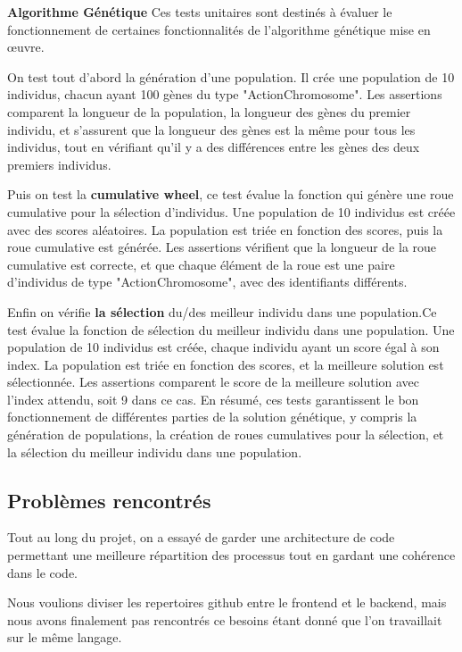 \documentclass[french,a4paper,10pt,twocolumn]{article}
\begin{document}
\textbf{Algorithme Génétique}
Ces tests unitaires sont destinés à évaluer le fonctionnement de certaines fonctionnalités de l'algorithme génétique mise en œuvre.

On test tout d'abord la génération d'une population. Il crée une population de 10 individus, chacun ayant 100 gènes du type "ActionChromosome". 
Les assertions comparent la longueur de la population, la longueur des gènes du premier individu, 
et s'assurent que la longueur des gènes est la même pour tous les individus, tout en vérifiant qu'il y a des différences entre les gènes des deux premiers individus.
    
Puis on test la \textbf{cumulative wheel}, ce test évalue la fonction qui génère une roue cumulative pour la sélection d'individus. 
Une population de 10 individus est créée avec des scores aléatoires. 
La population est triée en fonction des scores, puis la roue cumulative est générée. 
Les assertions vérifient que la longueur de la roue cumulative est correcte, 
et que chaque élément de la roue est une paire d'individus de type "ActionChromosome", avec des identifiants différents.

Enfin on vérifie \textbf{la sélection} du/des meilleur individu dans une population.Ce test évalue la fonction de sélection du meilleur individu dans une population. 
Une population de 10 individus est créée, chaque individu ayant un score égal à son index. La population est triée en fonction des scores,
et la meilleure solution est sélectionnée. Les assertions comparent le score de la meilleure solution avec l'index attendu, soit 9 dans ce cas.
En résumé, ces tests garantissent le bon fonctionnement de différentes parties de la solution génétique, y compris la génération de populations, la création de roues cumulatives pour la sélection, et la sélection du meilleur individu dans une population.

\subsection{Problèmes rencontrés}

Tout au long du projet, on a essayé de garder une architecture de code permettant une meilleure répartition des processus
tout en gardant une cohérence dans le code. 

Nous voulions diviser les repertoires github entre le frontend et le backend, mais nous avons finalement pas rencontrés ce besoins étant donné
que l'on travaillait sur le même langage. 
\end{document}
